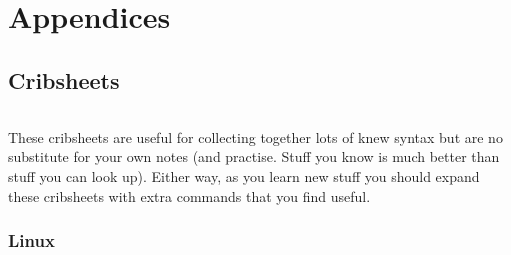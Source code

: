 \documentclass[12pt, a4paper, oneside]{book}
\begin{document}







\part{Appendices}

\appendix
\chapter{Cribsheets}
\label{cribsheets}
\paragraph{} These cribsheets are useful for collecting together lots of knew syntax but are no substitute for your own notes (and practise. Stuff you know is much better than stuff you can look up). Either way, as you learn new stuff you should expand these cribsheets with extra commands that you find useful.

\section{Linux}
\label{cribsheet_linux}
\end{document}
